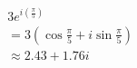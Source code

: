 \documentclass[preview]{standalone}
\begin{document}
\begin{align*}
&3e^{i\left(\frac{\pi}{5}\right)} \\ &=3\left(\cos\frac{\pi}{5} + i\sin\frac{\pi}{5}\right) \\ &\approx 2.43 + 1.76i
\end{align*}
\end{document}
